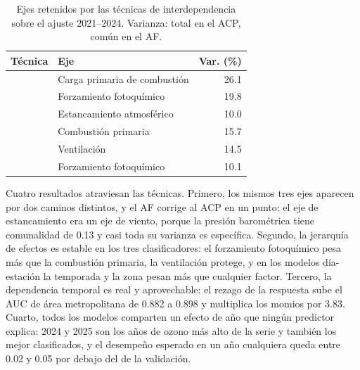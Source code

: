 \begin{table}[pos=t]
  \centering
  \caption{Ejes retenidos por las técnicas de interdependencia sobre el
    ajuste 2021--2024. Varianza: total en el ACP, común en el AF.}
  \label{tab:resultados-ejes}
  \small
  \begin{tabular}{llr}
    \toprule
    Técnica & Eje & Var. (\%) \\
    \midrule
      & Carga primaria de combustión & 26.1 \\
      & Forzamiento fotoquímico      & 19.8 \\
      & Estancamiento atmosférico    & 10.0 \\
    \midrule
      & Combustión primaria          & 15.7 \\
      & Ventilación                  & 14.5 \\
      & Forzamiento fotoquímico      & 10.1 \\
    \bottomrule
  \end{tabular}
\end{table}

Cuatro resultados atraviesan las técnicas. Primero, los mismos tres ejes
aparecen por dos caminos distintos, y el AF corrige al ACP en un punto: el
eje de estancamiento era un eje de viento, porque la presión barométrica
tiene comunalidad de 0.13 y casi toda su varianza es específica. Segundo, la
jerarquía de efectos es estable en los tres clasificadores: el forzamiento
fotoquímico pesa más que la combustión primaria, la ventilación protege, y
en los modelos día-estación la temporada y la zona pesan más que cualquier
factor. Tercero, la dependencia temporal es real y aprovechable: el rezago
de la respuesta sube el AUC de área metropolitana de 0.882 a 0.898 y
multiplica los momios por 3.83. Cuarto, todos los modelos comparten un
efecto de año que ningún predictor explica: 2024 y 2025 son los años de
ozono más alto de la serie y también los mejor clasificados, y el desempeño
esperado en un año cualquiera queda entre 0.02 y 0.05 por debajo del de la
validación.
